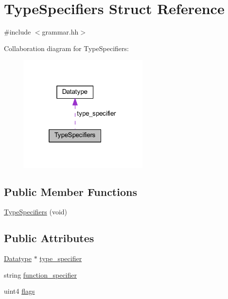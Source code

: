 \hypertarget{struct_type_specifiers}{}\section{Type\+Specifiers Struct Reference}
\label{struct_type_specifiers}


{\ttfamily \#include $<$grammar.\+hh$>$}



Collaboration diagram for Type\+Specifiers\+:
\nopagebreak
\begin{figure}[H]
\begin{center}
\leavevmode
\includegraphics[width=184pt]{struct_type_specifiers__coll__graph}
\end{center}
\end{figure}
\subsection*{Public Member Functions}
\begin{DoxyCompactItemize}
\item 
\mbox{\hyperlink{struct_type_specifiers_ac613ba61b3796932a0aa204cb375051d}{Type\+Specifiers}} (void)
\end{DoxyCompactItemize}
\subsection*{Public Attributes}
\begin{DoxyCompactItemize}
\item 
\mbox{\hyperlink{class_datatype}{Datatype}} $\ast$ \mbox{\hyperlink{struct_type_specifiers_a09d5f5bea9eb8e5fdb2e70143580beaf}{type\+\_\+specifier}}
\item 
string \mbox{\hyperlink{struct_type_specifiers_a85855a0fe7fb74ea6d1702bdc0ee346d}{function\+\_\+specifier}}
\item 
uint4 \mbox{\hyperlink{struct_type_specifiers_ae3c1cae0216fef561e4261f50355a3a9}{flags}}
\end{DoxyCompactItemize}


